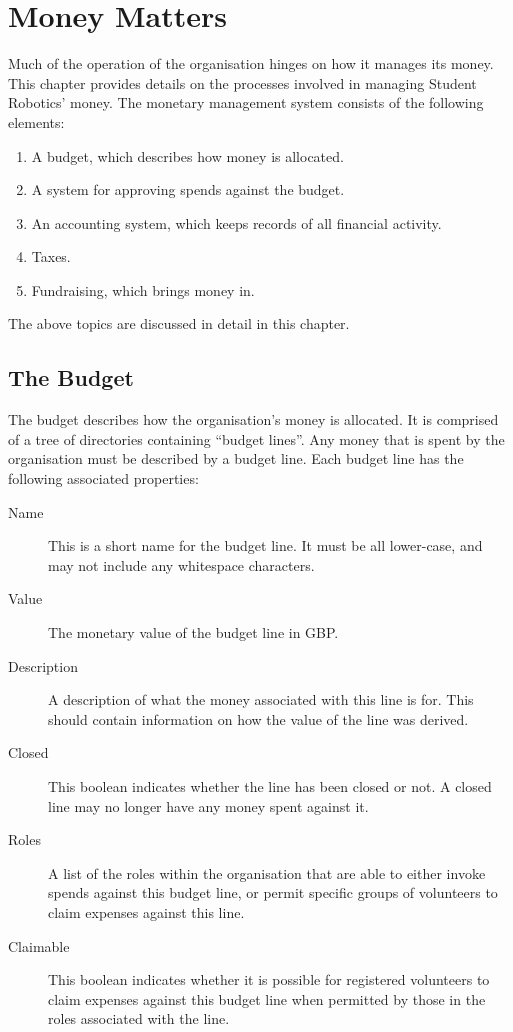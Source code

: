 \chapter{Money Matters}

Much of the operation of the organisation hinges on how it manages its money.  This chapter provides details on the processes involved in managing Student Robotics' money.  The monetary management system consists of the following elements:

\begin{enumerate}
\item A budget, which describes how money is allocated.
\item A system for approving spends against the budget.
\item An accounting system, which keeps records of all financial activity.
\item Taxes.
\item Fundraising, which brings money in.
\end{enumerate}

The above topics are discussed in detail in this chapter.


\section{The Budget}
\label{sec:budget}

The budget describes how the organisation's money is allocated.  It is comprised of a tree of directories containing ``budget lines''.  Any money that is spent by the organisation must be described by a budget line.    Each budget line has the following associated properties:

\begin{description}
\item[Name] This is a short name for the budget line.  It must be all lower-case, and may not include any whitespace characters.
\item[Value]  The monetary value of the budget line in GBP.
\item[Description] A description of what the money associated with this line is for.  This should contain information on how the value of the line was derived.
\item[Closed] This boolean indicates whether the line has been closed or not.  A closed line may no longer have any money spent against it.
\item[Roles] A list of the roles within the organisation that are able to either invoke spends against this budget line, or permit specific groups of volunteers to claim expenses against this line.
\item[Claimable] This boolean indicates whether it is possible for registered volunteers to claim expenses against this budget line when permitted by those in the roles associated with the line.
\end{description}

